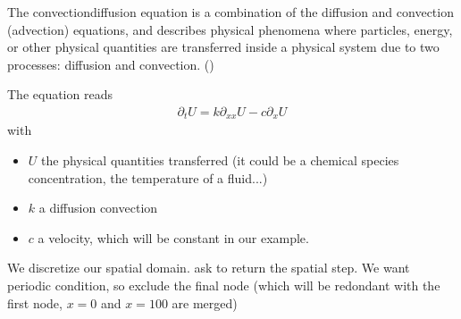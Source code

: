 \documentclass[letterpaper,10pt,english]{sphinxmanual}
\begin{document}
The convection\textendash{}diffusion equation is a combination of the diffusion and
convection (advection) equations, and describes physical phenomena where
particles, energy, or other physical quantities are transferred inside a
physical system due to two processes: diffusion and convection.
()

The equation reads
\begin{equation*}
\begin{split}\partial_{t}U = k \partial_{xx} U - c \partial_{x} U\end{split}
\end{equation*}
with
\begin{itemize}
\item {} 
\(U\) the physical quantities transferred (it could be a chemical
species concentration, the temperature of a fluid...)

\item {} 
\(k\) a diffusion convection

\item {} 
\(c\) a velocity, which will be constant in our example.

\end{itemize}

\begin{sphinxVerbatim}[commandchars=\\\{\}]
  
               \PYG{p}{[} \PYG{p}{]}
\end{sphinxVerbatim}

We discretize our spatial domain.  ask to return the
spatial step. We want periodic condition, so  exclude
the final node (which will be redondant with the first node, \(x=0\)
and \(x=100\) are merged)

\begin{sphinxVerbatim}[commandchars=\\\{\}]
       
\end{sphinxVerbatim}
\end{document}
